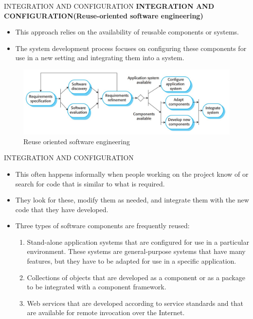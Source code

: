 \documentclass{beamer}
\begin{document}
\begin{frame}{INTEGRATION AND CONFIGURATION}
\textbf{INTEGRATION AND CONFIGURATION(Reuse-oriented software engineering)}
\begin{itemize}
	\item This approach relies on the availability of reusable components or systems. 
	\item The system development process focuses on configuring these components for use in a new setting and integrating them into a system.
\end{itemize}
\begin{figure}
		\includegraphics[scale=.4]{img/m1_7.jpg}
	\caption{Reuse oriented software 
		engineering}
\end{figure}
\end{frame}
\begin{frame}{INTEGRATION AND CONFIGURATION}
\begin{itemize}
	\item This often happens informally when people working on the project know of or search for code that is similar to what is required. 
	\item They look for these, modify them as needed, and integrate them with the new code that they have developed.
	\item Three types of software components are frequently reused:
	\begin{enumerate}
		\item Stand-alone application systems that are configured for use in a particular environment. These systems are general-purpose systems that have many features, but they have to be adapted for use in a specific application.
		
		\item Collections of objects that are developed as a component or as a package to be integrated with a component framework.
		
		\item Web services that are developed according to service standards and that are available for remote invocation over the Internet.
	\end{enumerate}
\end{itemize}
\end{frame}
\end{document}

